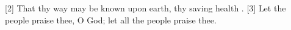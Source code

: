 [2] \textcolor[cmyk]{0.99998,1,0,0}{That thy way may be known upon earth, thy saving health .} %
[3] \textcolor[cmyk]{0.99998,1,0,0}{Let the people praise thee, O God; let all the people praise thee.}
